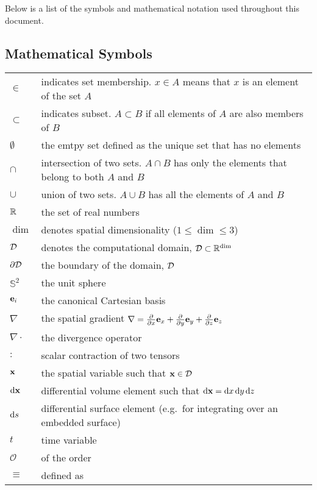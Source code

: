 \documentclass[../doc.tex]{subfiles}
\begin{document}
Below is a list of the symbols and mathematical notation used throughout this document. 

\subsection*{Mathematical Symbols}
\begin{longtable}{p{2cm}p{12cm}}
$\in$ & indicates set membership. $x \in A$ means that $x$ is an element of the set $A$\\
$\subset$ & indicates subset. $A \subset B$ if all elements of $A$ are also members of $B$ \\
$\emptyset$ & the emtpy set defined as the unique set that has no elements \\
$\cap$ & intersection of two sets. $A\cap B$ has only the elements that belong to both $A$ and $B$ \\
$\cup$ & union of two sets. $A\cup B$ has all the elements of $A$ and $B$ \\
$\mathbb{R}$ & the set of real numbers \\
$\dim$ & denotes spatial dimensionality ($1\leq \dim \leq 3$) \\
$\mathcal{D}$ & denotes the computational domain, $\mathcal{D} \subset \mathbb{R}^{\dim}$\\ 
$\partial\mathcal{D}$ & the boundary of the domain, $\mathcal{D}$ \\
$\mathbb{S}^2$ & the unit sphere \\
$\boldsymbol{\mathrm{e}}_i$ & the canonical Cartesian basis \\
$\nabla$ & the spatial gradient $\nabla = \frac{\partial }{\partial x} \boldsymbol{\mathrm{e}}_x + \frac{\partial }{\partial y}\boldsymbol{\mathrm{e}}_y + \frac{\partial }{\partial z}\boldsymbol{\mathrm{e}}_z$ \\
$\nabla\cdot$ & the divergence operator \\
$:$ & scalar contraction of two tensors \\
$\boldsymbol{\mathrm{x}}$ & the spatial variable such that $\boldsymbol{\mathrm{x}} \in \mathcal{D}$ \\
$\mathop{}\!\mathrm{d}\boldsymbol{\mathrm{x}}$ & differential volume element such that $\mathop{}\!\mathrm{d}\boldsymbol{\mathrm{x}} = \mathop{}\!\mathrm{d} x \mathop{}\!\mathrm{d} y \mathop{}\!\mathrm{d} z$ \\ 
$\mathop{}\!\mathrm{d} s$ & differential surface element (e.g.~for integrating over an embedded surface) \\
$t$ & time variable \\
$\mathcal{O}$ & of the order \\
$\equiv$ & defined as \\
\end{longtable}
\end{document}
